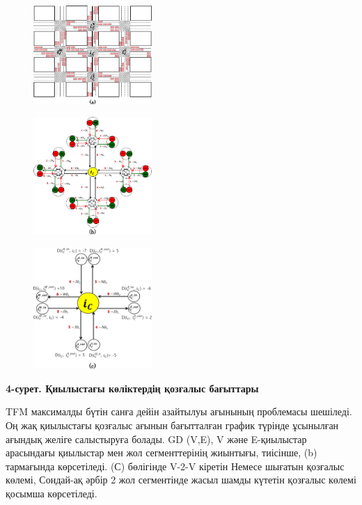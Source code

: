 \begin{figure}[H]
	\centering
	\includegraphics[width=0.4\textwidth]{assets/165}
	\caption*{}
\end{figure}

\begin{figure}[H]
	\centering
	\includegraphics[width=0.4\textwidth]{assets/166}
	\caption*{}
\end{figure}

\begin{figure}[H]
	\centering
	\includegraphics[width=0.4\textwidth]{assets/167}
	\caption*{}
\end{figure}

{\bfseries 4-сурет. Қиылыстағы көліктердің қозғалыс бағыттары}

TFM максималды бүтін санға дейін азайтылуы ағынының проблемасы шешіледі.
Оң жақ қиылыстағы қозғалыс ағынын бағытталған график түрінде ұсынылған
ағындық желіге салыстыруға болады. GD (V,E), V және E-қиылыстар
арасындағы қиылыстар мен жол сегменттерінің жиынтығы, тиісінше, (b)
тармағында көрсетіледі. (С) бөлігінде V-2-V кіретін Немесе шығатын
қозғалыс көлемі, Сондай-ақ әрбір 2 жол сегментінде жасыл шамды күтетін
қозғалыс көлемі қосымша көрсетіледі.

